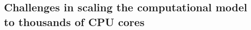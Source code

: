 \begin{subappendices}

\section{Challenges in scaling the computational model to thousands of CPU cores}


\end{subappendices}


\cleardoublepage

